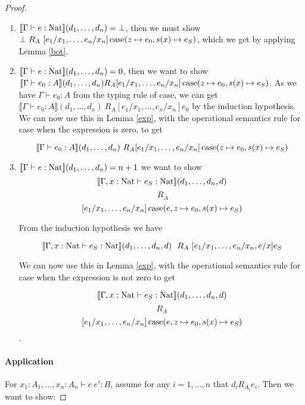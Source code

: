 \begin{proof}
\begin{enumerate}
\item{$\llbracket \Gamma \vdash e : \operatorname{Nat} \rrbracket (d_1, \dots, d_n) = \bot$, then we must show $\bot \ R_A \ [e_1/x_1, \dots, e_n/x_n] \\ \operatorname{case} (z \mapsto e_0, s(x) \mapsto e_S)$, which we get by applying Lemma \ref{bot}.}
\item{$\llbracket \Gamma \vdash e : \operatorname{Nat} \rrbracket (d_1, \dots, d_n) = 0$, then we want to show $\llbracket \Gamma \vdash e_0 : A \rrbracket (d_1, \dots, d_n) \ \\ R_A [e_1/x_1, \dots, e_n/x_n]\operatorname{case} (z \mapsto e_0, s(x) \mapsto e_S)$. As we have $\Gamma \vdash e_0 : A$ from the typing rule of case, we can get $\llbracket \Gamma \vdash e_0 : A \rrbracket (d_1, \dots, d_n) \ R_A [e_1/x_1, \dots, e_n/x_n]e_0$ by the induction hypothesis. We can now use this in Lemma \ref{exp}, with the operational semantics rule for case when the expression is zero, to get 

\[\llbracket \Gamma \vdash e_0 : A \rrbracket (d_1, \dots, d_n) \ R_A [e_1/x_1, \dots, e_n/x_n]\operatorname{case} (z \mapsto e_0, s(x) \mapsto e_S)\]
}
\item{$\llbracket \Gamma \vdash e : \operatorname{Nat} \rrbracket (d_1, \dots, d_n) = n+1$ we want to show
\[ \llbracket \Gamma, x : \operatorname{Nat} \vdash e_S : \operatorname{Nat} \rrbracket(d_1, \dots , d_n, d) \]
\[\ R_A \]
\[ [e_1/x_1, \dots, e_n/x_n]\operatorname{case} (e, z \mapsto e_0, s(x) \mapsto e_S)\]

From the induction hypothesis we have 

\[ \llbracket \Gamma, x : \operatorname{Nat} \vdash e_S : \operatorname{Nat} \rrbracket(d_1, \dots, d_n, d) \ \ R_A \ [e_1/x_1, \dots, e_n/x_n, e/x]e_S\]

We can now use this in Lemma \ref{exp}, with the operational semantics rule for case when the expression is not zero to get 

\[ \llbracket \Gamma, x : \operatorname{Nat} \vdash e_S : \operatorname{Nat} \rrbracket(d_1, \dots , d_n, d) \]
\[ R_A \]
\[ [e_1/x_1, \dots, e_n/x_n]\operatorname{case} (e, z \mapsto e_0, s(x) \mapsto e_S)\].


}
\end{enumerate}

\paragraph{Application} For $x_1 : A_1, \dots, x_n : A_n \vdash e \ e' : B$, assume for any $i = 1, \dots, n$ that $d_i R_{A_i} e_i$. Then we want to show:


\end{proof}
